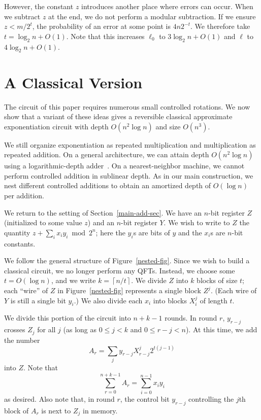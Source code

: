 \documentclass{article} %
\newcommand{\caps}[1]{{\sc #1}}
\newcommand{\ceil}[1]{\left\lceil #1 \right\rceil}
\newcommand{\DKRS}{cla}
\newcommand{\QFT}{\caps{QFT}\xspace}
\begin{document}
However, the constant $z$ introduces another place where errors can
occur.  When we subtract $z$ at the end, we do not perform a modular
subtraction.  If we ensure $z < m/2^t$, the probability of an error
at some point is $4n 2^{-t}$.  We therefore take $t = \log_2 n +
O(1)$.  Note that this increases $\ell_0$ to $3 \log_2 n + O(1)$
and $\ell$ to $4 \log_2 n + O(1)$.

\section{A Classical Version}
\label{classical-sec}

The circuit of this paper requires numerous small controlled rotations.
We now show that a variant of these ideas gives a reversible classical
approximate exponentiation circuit with depth $O(n^2 \log n)$ and
size $O(n^3)$.

We still organize exponentiation as repeated multiplication and
multiplication as repeated addition.  On a general architecture, we
can attain depth $O(n^2 \log n)$ using a logarithmic-depth
adder~\cite{\DKRS}.  On a nearest-neighbor machine, we cannot
perform controlled addition in sublinear depth.  As in our main
construction, we nest different controlled additions to obtain an
amortized depth of $O(\log n)$ per addition.

We return to the setting of Section~\ref{main-add-sec}.  We
have an $n$-bit register $Z$ (initialized to some value $z$) and
an $n$-bit register $Y$.  We wish to write to $Z$ the quantity
$z + \sum_i x_i y_i \bmod 2^n$; here the $y_i$s are bits of $y$ and
the $x_i$s are $n$-bit constants.

We follow the general structure of Figure~\ref{nested-fig}.  Since
we wish to build a classical circuit, we no longer perform any
{\QFT}s.  Instead, we choose some $t = O(\log n)$, and we write
$k = \ceil{n/t}$.  We divide $Z$ into $k$ blocks of size $t$; each
``wire'' of $Z$ in Figure~\ref{nested-fig} represents a single block
$Z^j$.  (Each wire of $Y$ is still a single bit $y_i$.)  We also
divide each $x_i$ into blocks $X_i^j$ of length $t$.

We divide this portion of the circuit into $n+k-1$ rounds.  In
round $r$, $y_{r-j}$ crosses $Z_j$ for all $j$ (as long as $0 \le j < k$
and $0 \le r-j < n$).  At this time, we add the number
$$
A_r = \sum_j y_{r-j} X_{r-j}^j 2^{t(j-1)}
$$
into $Z$.  Note that
$$\sum_{r=0}^{n+k-1} A_r = \sum_{i=0}^{n-1} x_i y_i$$
as desired.  Also note that, in round $r$, the control bit
$y_{r-j}$ controlling the $j$th block of $A_r$ is next to $Z_j$ in
memory.
\end{document}
